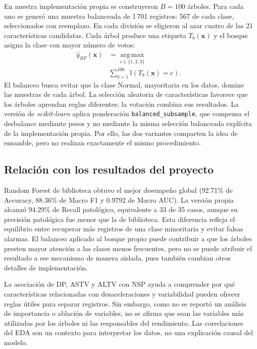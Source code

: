 En nuestra implementaci\'on propia se construyeron $B=100$ \'arboles. Para cada uno se gener\'o una muestra balanceada de 1\,701 registros: 567 de cada clase, seleccionados con reemplazo. En cada divisi\'on se eligieron al azar cuatro de las 21 caracter\'isticas candidatas. Cada \'arbol produce una etiqueta $T_b(\mathbf{x})$ y el bosque asigna la clase con mayor n\'umero de votos:
\begin{equation}
\begin{aligned}
\hat y_{RF}(\mathbf{x})&=\operatorname*{arg\,max}_{c\in\{1,2,3\}}\\
&\sum_{b=1}^{100}\mathbb{I}(T_b(\mathbf{x})=c).
\end{aligned}
\end{equation}
El balanceo busca evitar que la clase Normal, mayoritaria en los datos, domine las muestras de cada \'arbol. La selecci\'on aleatoria de caracter\'isticas favorece que los \'arboles aprendan reglas diferentes; la votaci\'on combina sus resultados. La versi\'on de \textit{scikit-learn} aplica ponderaci\'on \texttt{balanced\_subsample}, que compensa el desbalance mediante pesos y no mediante la misma selecci\'on balanceada expl\'icita de la implementaci\'on propia. Por ello, las dos variantes comparten la idea de ensamble, pero no realizan exactamente el mismo procedimiento.

\subsection{Relaci\'on con los resultados del proyecto}
Random Forest de biblioteca obtuvo el mejor desempe\~no global (92.71\% de Accuracy, 88.36\% de Macro F1 y 0.9792 de Macro AUC). La versi\'on propia alcanz\'o 94.29\% de Recall patol\'ogico, equivalente a 33 de 35 casos, aunque su precisi\'on patol\'ogica fue menor que la de biblioteca. Esta diferencia refleja el equilibrio entre recuperar m\'as registros de una clase minoritaria y evitar falsas alarmas. El balanceo aplicado al bosque propio puede contribuir a que los \'arboles presten mayor atenci\'on a las clases menos frecuentes, pero no se puede atribuir el resultado a ese mecanismo de manera aislada, pues tambi\'en cambian otros detalles de implementaci\'on.

La asociaci\'on de DP, ASTV y ALTV con NSP ayuda a comprender por qu\'e caracter\'isticas relacionadas con desaceleraciones y variabilidad pueden ofrecer reglas \'utiles para separar registros. Sin embargo, como no se report\'o un an\'alisis de importancia o ablaci\'on de variables, no se afirma que sean las variables m\'as utilizadas por los \'arboles ni las responsables del rendimiento. Las correlaciones del EDA son un contexto para interpretar los datos, no una explicaci\'on causal del modelo.

